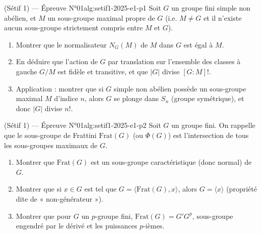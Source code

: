 \begin{problem}{(Sétif 1) — Épreuve N°01}{alg:setif1-2025-e1-p1}
Soit $G$ un groupe fini simple non abélien, et $M$ un sous-groupe maximal propre de
$G$ (i.e. $M\ne G$ et il n'existe aucun sous-groupe strictement compris entre $M$
et $G$).
\begin{enumerate}
\item Montrer que le normalisateur $N_G(M)$ de $M$ dans $G$ est égal à $M$.
\item En déduire que l'action de $G$ par translation sur l'ensemble des classes à
      gauche $G/M$ est fidèle et transitive, et que $|G|$ divise $[G:M]!$.
\item Application : montrer que si $G$ simple non abélien possède un sous-groupe
      maximal $M$ d'indice $n$, alors $G$ se plonge dans $S_n$ (groupe symétrique),
      et donc $|G|$ divise $n!$.
\end{enumerate}

\end{problem}

\newpage

\begin{problem}{(Sétif 1) — Épreuve N°01}{alg:setif1-2025-e1-p2}
Soit $G$ un groupe fini. On rappelle que le sous-groupe de Frattini
$\mathrm{Frat}(G)$ (ou $\Phi(G)$) est l'intersection de tous les sous-groupes
maximaux de $G$.
\begin{enumerate}
\item Montrer que $\mathrm{Frat}(G)$ est un sous-groupe caractéristique (donc
      normal) de $G$.
\item Montrer que si $x\in G$ est tel que $G=\langle \mathrm{Frat}(G),x\rangle$,
      alors $G=\langle x\rangle$ (propriété dite de « non-générateur »).
\item Montrer que pour $G$ un $p$-groupe fini,
      $\mathrm{Frat}(G)=G'G^p$, sous-groupe engendré par le dérivé et les puissances
      $p$-ièmes.
\end{enumerate}

\end{problem}

\newpage

